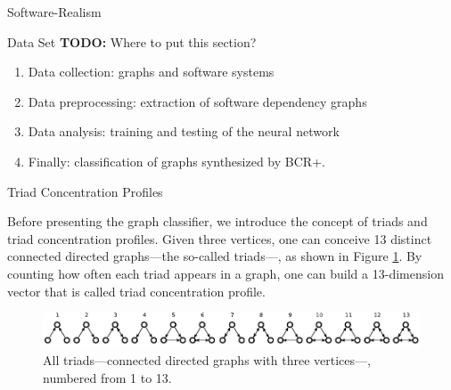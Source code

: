 \documentclass[11pt,twocolumn,a4paper,english]{article}
\newcommand{\TODO}{\textbf{TODO:} }
\begin{document}
\begin{section}{Software-Realism}
	
	

\begin{subsection}{Data Set}
	\TODO Where to put this section?
	
	\begin{enumerate}
		\item Data collection: graphs and software systems
		\item Data preprocessing: extraction of software dependency graphs
		\item Data analysis: training and testing of the neural network
		\item Finally: classification of graphs synthesized by BCR+.
	\end{enumerate}
	
\end{subsection}

\begin{subsection}{Triad Concentration Profiles}
	
	Before presenting the graph classifier, we introduce the concept of triads and triad concentration profiles. Given three vertices, one can conceive 13 distinct connected directed graphs---the so-called triads---, as shown in Figure \ref{fig:triads}. By counting how often each triad appears in a graph, one can build a 13-dimension vector that is called triad concentration profile. %

	\begin{figure}[htbp]
		\centering
			\includegraphics[scale=1]{figures/triads}
		\caption{All triads---connected directed graphs with three vertices---, numbered from 1 to 13.}
		\label{fig:triads}
	\end{figure}
	

\end{subsection}
\end{section}
\end{document}
